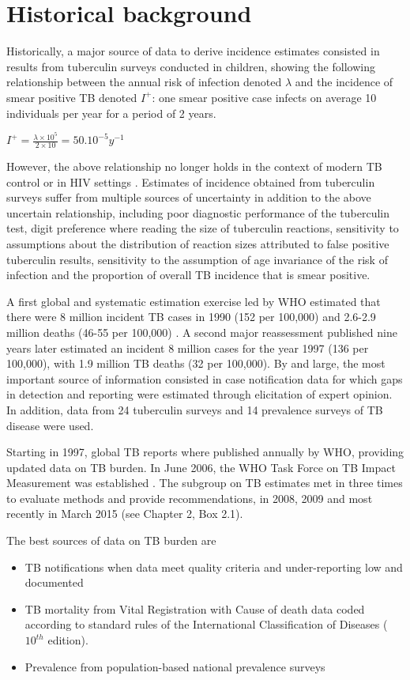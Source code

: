 \section{Historical background}

Historically, a major source of data to derive incidence estimates consisted in results from tuberculin surveys conducted in children\cite{Styblo1985}, showing the following relationship between the annual risk of infection denoted $\lambda$ and the incidence of smear positive TB denoted $I^+$: one smear positive case infects on average 10 individuals per year for a period of 2 years.

$I^+ = \frac{\lambda \times 10^5}{2 \times 10} = 50.10^{-5} y^{-1}$

However, the above relationship no longer holds in the context of modern TB control or in HIV settings \cite{18235886}. Estimates of incidence obtained from tuberculin surveys suffer from multiple sources of uncertainty in addition to the above uncertain relationship, including poor diagnostic performance of the tuberculin test, digit preference where reading the size of tuberculin reactions, sensitivity to assumptions about the distribution of reaction sizes attributed to false positive tuberculin results, sensitivity to the assumption of age invariance of the risk of infection and the proportion of overall TB incidence that is smear positive. 

A first global and systematic estimation exercise led by WHO estimated that there were 8 million incident TB cases in 1990 (152 per 100,000) and 2.6-2.9 million deaths (46-55 per 100,000) \cite{1600578}. A second major reassessment published nine years later \cite{10517722} estimated an incident 8 million cases for the year 1997 (136 per 100,000), with 1.9 million TB deaths (32 per 100,000). By and large, the most important source of information consisted in case notification data for which gaps in detection and reporting were estimated through elicitation of expert opinion. In addition, data from 24 tuberculin surveys and 14 prevalence surveys of TB disease were used.

Starting in 1997, global TB reports where published annually by WHO, providing updated data on TB burden. In June 2006, the WHO Task Force on TB Impact Measurement was established \cite{18201929}. The subgroup on TB estimates met in three times to evaluate methods and provide recommendations, in 2008, 2009 and most recently in March 2015 (see Chapter 2, Box 2.1).

The best sources of data on TB burden are 
\begin{itemize}
\item TB notifications when data meet quality criteria and under-reporting low and documented
\item TB mortality from Vital Registration with Cause of death data coded according to standard rules of the International Classification of Diseases ($10^{th}$ edition).
\item Prevalence from population-based national prevalence surveys
\end{itemize}




  
  
  
  
  
  
  
  
  
  
  